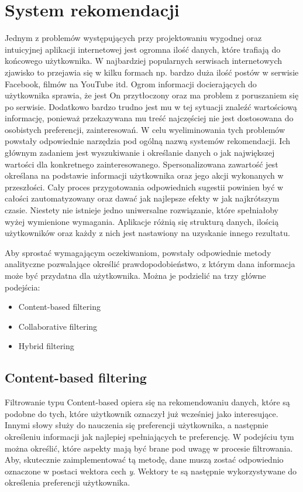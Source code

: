 \chapter{System rekomendacji}

Jednym z problemów występujących przy projektowaniu wygodnej oraz intuicyjnej aplikacji internetowej jest ogromna ilość danych, które trafiają do końcowego użytkownika. W najbardziej popularnych  serwisach internetowych zjawisko to przejawia się w kilku formach np. bardzo duża ilość postów w serwisie Facebook, filmów na YouTube itd. Ogrom informacji docierających do użytkownika sprawia, że jest On przytłoczony oraz ma problem z poruszaniem się po serwisie. Dodatkowo bardzo trudno jest mu w tej sytuacji znaleźć wartościową informację, ponieważ przekazywana mu treść najczęściej nie jest dostosowana do osobistych preferencji, zainteresowań. W celu wyeliminowania tych problemów powstały odpowiednie narzędzia pod ogólną nazwą systemów rekomendacji. Ich głównym zadaniem jest wyszukiwanie i określanie danych o jak największej wartości dla konkretnego zainteresowanego. Spersonalizowana zawartość jest określana na podstawie informacji użytkownika oraz jego akcji wykonanych w przeszłości. Cały proces przygotowania odpowiednich sugestii powinien być w całości zautomatyzowany oraz dawać jak najlepsze efekty w jak najkrótszym czasie. Niestety nie istnieje jedno uniwersalne rozwiązanie, które spełniałoby wyżej wymienione wymagania. Aplikacje różnią się strukturą danych, ilością użytkowników oraz każdy z nich jest nastawiony na uzyskanie innego rezultatu.


Aby sprostać wymagającym oczekiwaniom, powstały odpowiednie metody analityczne pozwalające określić prawdopodobieństwo, z którym dana informacja może być przydatna dla użytkownika. Można je podzielić na trzy główne podejścia:

\begin{itemize}
	\item Content-based filtering
	\item Collaborative filtering
	\item Hybrid filtering
\end{itemize}




\section{Content-based filtering}

Filtrowanie typu Content-based opiera się na rekomendowaniu danych, które są podobne do tych, które użytkownik oznaczył już wcześniej jako interesujące\cite{REC01}. Innymi słowy służy do nauczenia się preferencji użytkownika, a następnie określeniu informacji jak najlepiej spełniających te preferencję. W podejściu tym można określić, które aspekty mają być brane pod uwagę w procesie filtrowania. Aby, skutecznie zaimplementować tą metodę, dane muszą zostać odpowiednio oznaczone w postaci wektora cech \textit{y}. Wektory te są następnie wykorzystywane do określenia preferencji użytkownika.

